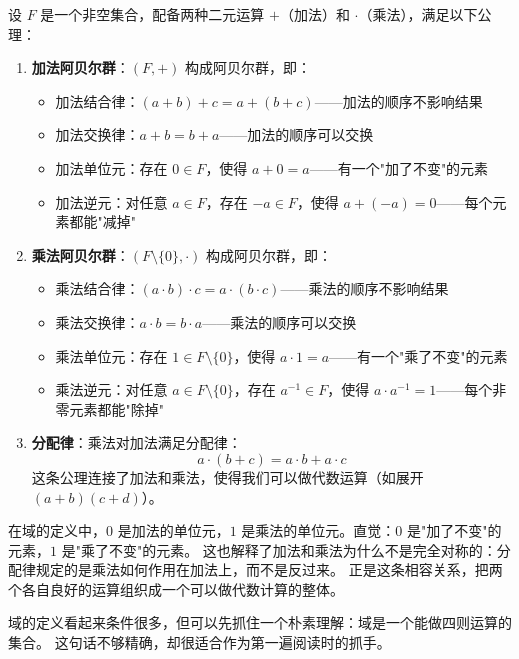 \begin{definition}[域]\label{def:field}
设 $F$ 是一个非空集合，配备两种二元运算 $+$（加法）和 $\cdot$（乘法），满足以下公理：

\begin{enumerate}
    \item \textbf{加法阿贝尔群}：$(F, +)$ 构成阿贝尔群，即：
    \begin{itemize}
        \item 加法结合律：$(a + b) + c = a + (b + c)$——加法的顺序不影响结果
        \item 加法交换律：$a + b = b + a$——加法的顺序可以交换
        \item 加法单位元：存在 $0 \in F$，使得 $a + 0 = a$——有一个"加了不变"的元素
        \item 加法逆元：对任意 $a \in F$，存在 $-a \in F$，使得 $a + (-a) = 0$——每个元素都能"减掉"
    \end{itemize}

    \item \textbf{乘法阿贝尔群}：$(F \setminus \{0\}, \cdot)$ 构成阿贝尔群，即：
    \begin{itemize}
        \item 乘法结合律：$(a \cdot b) \cdot c = a \cdot (b \cdot c)$——乘法的顺序不影响结果
        \item 乘法交换律：$a \cdot b = b \cdot a$——乘法的顺序可以交换
        \item 乘法单位元：存在 $1 \in F \setminus \{0\}$，使得 $a \cdot 1 = a$——有一个"乘了不变"的元素
        \item 乘法逆元：对任意 $a \in F \setminus \{0\}$，存在 $a^{-1} \in F$，使得 $a \cdot a^{-1} = 1$——每个非零元素都能"除掉"
    \end{itemize}

    \item \textbf{分配律}：乘法对加法满足分配律：
    \[a \cdot (b + c) = a \cdot b + a \cdot c\]
    这条公理连接了加法和乘法，使得我们可以做代数运算（如展开 $(a+b)(c+d)$）。
\end{enumerate}
\end{definition}

在域的定义中，$0$ 是加法的单位元，$1$ 是乘法的单位元。直觉：$0$ 是"加了不变"的元素，$1$ 是"乘了不变"的元素。
这也解释了加法和乘法为什么不是完全对称的：分配律规定的是乘法如何作用在加法上，而不是反过来。
正是这条相容关系，把两个各自良好的运算组织成一个可以做代数计算的整体。

域的定义看起来条件很多，但可以先抓住一个朴素理解：域是一个能做四则运算的集合。
这句话不够精确，却很适合作为第一遍阅读时的抓手。

